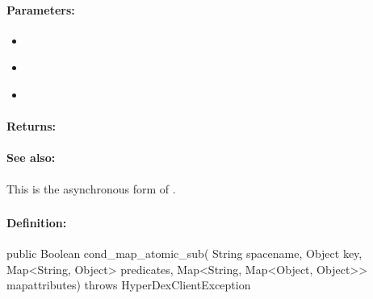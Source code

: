 \paragraph{Parameters:}
\begin{itemize}[noitemsep]
\item {}\\

\item {}\\

\item {}\\

\end{itemize}

\paragraph{Returns:}


\paragraph{See also:}  This is the asynchronous form of .

\pagebreak
\subsubsection{}
\label{api:java:cond_map_atomic_sub}


\paragraph{Definition:}
\begin{javacode}
public Boolean cond_map_atomic_sub(
        String spacename,
        Object key,
        Map<String, Object> predicates,
        Map<String, Map<Object, Object>> mapattributes) throws HyperDexClientException
\end{javacode}

